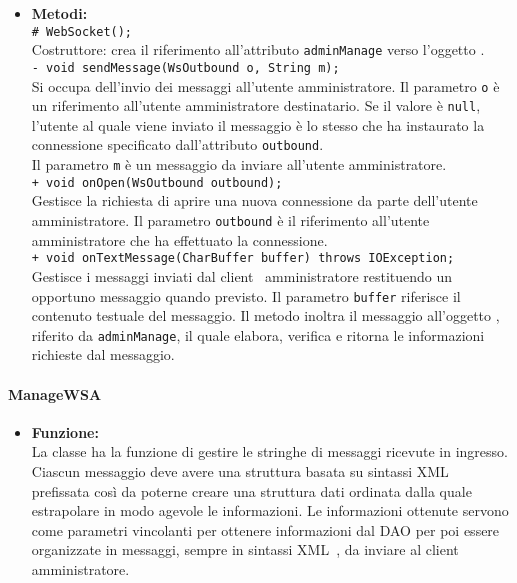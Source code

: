 {{\begin{sloppypar}
{{{\begin{itemize}
				\item[] \textbf{Metodi:}{\\
					\texttt{\# WebSocket();}\\
					Costruttore: crea il riferimento all'attributo \texttt{adminManage} verso l'oggetto  .\\
	
					\texttt{- void sendMessage(WsOutbound o, String m);}\\
					Si occupa dell'invio dei messaggi all'utente amministratore. 
					Il parametro \texttt{o} è un riferimento all'utente amministratore destinatario. Se il valore è \texttt{null}, l'utente al quale viene inviato il messaggio è lo stesso che ha instaurato la connessione specificato dall'attributo \texttt{outbound}.\\
					Il parametro \texttt{m} è un messaggio da inviare all'utente amministratore.\\
				
					\texttt{+ void onOpen(WsOutbound outbound);}\\
					Gestisce la richiesta di aprire una nuova connessione da parte dell'utente amministratore.
					Il parametro \texttt{outbound} è il riferimento all'utente amministratore che ha effettuato la connessione.\\
				
					\texttt{+ void onTextMessage(CharBuffer buffer) throws IOException;}\\
					Gestisce i messaggi inviati dal client\g~ amministratore restituendo un opportuno messaggio quando previsto.
					Il parametro \texttt{buffer} riferisce il contenuto testuale del messaggio.
					Il metodo inoltra il messaggio all'oggetto , riferito da \texttt{adminManage}, il quale elabora, verifica e ritorna le informazioni richieste dal messaggio.\\
				}
			\end{itemize}
		}
	
	

		\paragraph{ManageWSA}\label{par:ManageWSA}{
			\begin{itemize}
				\item[] \textbf{Funzione:}\\
					La classe ha la funzione di gestire le stringhe di messaggi ricevute in ingresso.
					Ciascun messaggio deve avere una struttura basata su sintassi XML\g~ prefissata così da poterne creare una struttura dati ordinata dalla quale estrapolare in modo agevole le informazioni.
					Le informazioni ottenute servono come parametri vincolanti per ottenere informazioni dal DAO per poi essere organizzate in messaggi, sempre in sintassi XML\g~, da inviare al client\g~ amministratore.\\
			

\end{itemize}}}}
\end{sloppypar}}}

